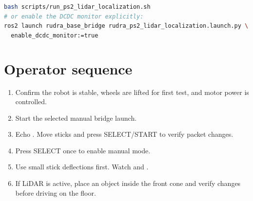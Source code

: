 \begin{lstlisting}[language=bash]
bash scripts/run_ps2_lidar_localization.sh
# or enable the DCDC monitor explicitly:
ros2 launch rudra_base_bridge rudra_ps2_lidar_localization.launch.py \
  enable_dcdc_monitor:=true
\end{lstlisting}

\section{Operator sequence}

\begin{enumerate}
  \item Confirm the robot is stable, wheels are lifted for first test, and motor power is controlled.
  \item Start the selected manual bridge launch.
  \item Echo . Move sticks and press SELECT/START to verify packet changes.
  \item Press SELECT once to enable manual mode.
  \item Use small stick deflections first. Watch  and .
  \item If LiDAR is active, place an object inside the front cone and verify  changes before driving on the floor.
\end{enumerate}
